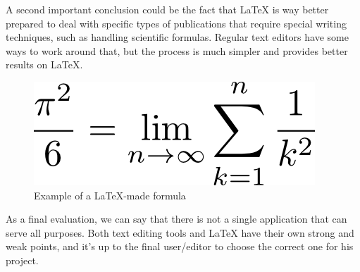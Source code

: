 A second important conclusion could be the fact that LaTeX is way better prepared to deal with specific types of publications that require special writing techniques, such as handling scientific formulas. Regular text editors have some ways to work around that, but the process is much simpler and provides better results on LaTeX.

\begin{figure}[H]
  \centering
  \includegraphics[scale=0.5]{Chapters/LatexFormulaEffect.png}
  \caption{ Example of a LaTeX-made formula\footnotemark }
  \label{fig:latex-formula-example}
\end{figure}

As a final evaluation, we can say that there is not a single application that can serve all purposes. Both text editing tools and LaTeX have their own strong and weak points, and it's up to the final user/editor to choose the correct one for his project.


